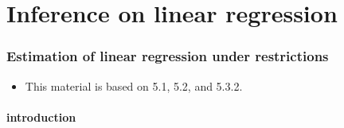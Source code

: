 

\part*{Inference on linear regression}%

\section{Estimation of linear regression under restrictions}

\begin{itemize}
\item This material is based on \citet{Gre12} 5.1, 5.2, and 5.3.2.
\end{itemize}

\subsection{introduction}


